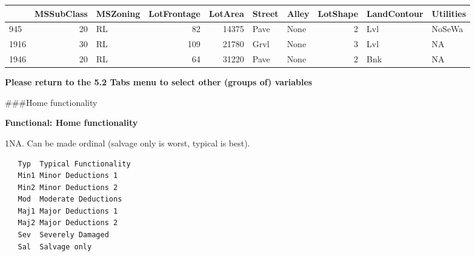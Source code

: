 \documentclass[]{article}
\newenvironment{Shaded}{\begin{snugshade}}{\end{snugshade}}
\newcommand{\CommentTok}[1]{\textcolor[rgb]{0.56,0.35,0.01}{\textit{#1}}}
\newcommand{\DecValTok}[1]{\textcolor[rgb]{0.00,0.00,0.81}{#1}}
\newcommand{\KeywordTok}[1]{\textcolor[rgb]{0.13,0.29,0.53}{\textbf{#1}}}
\newcommand{\NormalTok}[1]{#1}
\newcommand{\OperatorTok}[1]{\textcolor[rgb]{0.81,0.36,0.00}{\textbf{#1}}}
\newcommand{\OtherTok}[1]{\textcolor[rgb]{0.56,0.35,0.01}{#1}}
\newcommand{\StringTok}[1]{\textcolor[rgb]{0.31,0.60,0.02}{#1}}
\begin{document}
\begin{longtable}[]{@{}lrlrrllrll@{}}
\toprule
& MSSubClass & MSZoning & LotFrontage & LotArea & Street & Alley &
LotShape & LandContour & Utilities\tabularnewline
\midrule
\endhead
945 & 20 & RL & 82 & 14375 & Pave & None & 2 & Lvl &
NoSeWa\tabularnewline
1916 & 30 & RL & 109 & 21780 & Grvl & None & 3 & Lvl & NA\tabularnewline
1946 & 20 & RL & 64 & 31220 & Pave & None & 2 & Bnk & NA\tabularnewline
\bottomrule
\end{longtable}

\begin{Shaded}
\end{Shaded}

\textbf{Please return to the 5.2 Tabs menu to select other (groups of)
variables}

\#\#\#Home functionality

\textbf{Functional: Home functionality}

1NA. Can be made ordinal (salvage only is worst, typical is best).

\begin{verbatim}
   Typ  Typical Functionality
   Min1 Minor Deductions 1
   Min2 Minor Deductions 2
   Mod  Moderate Deductions
   Maj1 Major Deductions 1
   Maj2 Major Deductions 2
   Sev  Severely Damaged
   Sal  Salvage only
\end{verbatim}

\begin{Shaded}
\end{Shaded}
\end{document}
